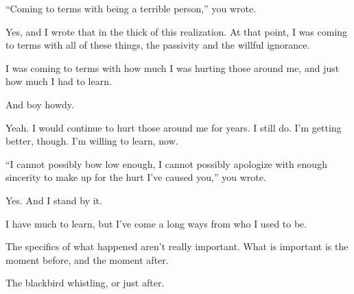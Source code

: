 \begin{ally}
``Coming to terms with being a terrible person,'' you wrote.
\end{ally}
Yes, and I wrote that in the thick of this realization. At that point, I was coming to terms with all of these things, the passivity and the willful ignorance.

I was coming to terms with how much I was hurting those around me, and just how much I had to learn.

\begin{ally}
And boy howdy.
\end{ally}
Yeah. I would continue to hurt those around me for years. I still do. I'm getting better, though. I'm willing to learn, now.

\begin{ally}
``I cannot possibly bow low enough, I cannot possibly apologize with enough sincerity to make up for the hurt I've caused you,'' you wrote.
\end{ally}
Yes. And I stand by it.

I have much to learn, but I've come a long ways from who I used to be.

The specifics of what happened aren't really important. What is important is the moment before, and the moment after.

\begin{ally}
The blackbird whistling, or just after.
\end{ally}
\newpage
\renewcommand*{\footnoterule}{\oldfootnoterule}
